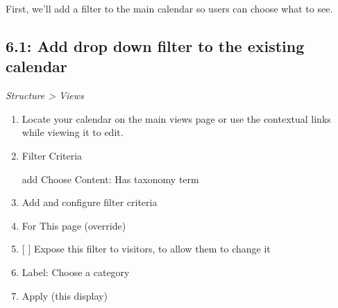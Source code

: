 \documentclass[letterpaper,10pt,english]{sphinxmanual}
\begin{document}
First, we'll add a filter to the main calendar so users can choose what to see.


\subsection{6.1: Add drop down filter to the existing calendar}
\label{event_calendar:add-drop-down-filter-to-the-existing-calendar}
\emph{Structure \textgreater{} Views}
\begin{enumerate}
\item {} 
Locate your calendar on the main views page or use the contextual links while viewing it to edit.

\item {} 
Filter Criteria

add
Choose Content: Has taxonomy term

\item {} 
Add and configure filter criteria

\item {} 
For This page (override)

\item {} 
{[}  {]} Expose this filter to visitors, to allow them to change it

\item {} 
Label: Choose a category

\item {} 
Apply (this display)

\end{enumerate}
\end{document}
